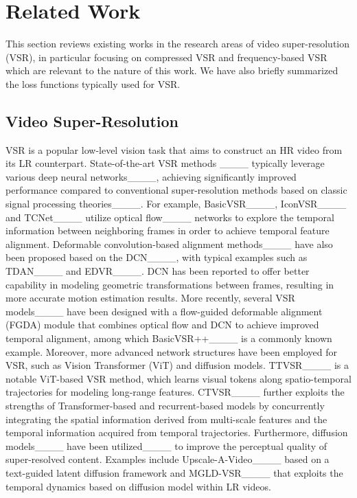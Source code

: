 \section{Related Work}
\label{RW}

This section reviews existing works in the research areas of video super-resolution (VSR), in particular focusing on compressed VSR and frequency-based VSR which are relevant to the nature of this work. We have also briefly summarized the loss functions typically used for VSR. 

\subsection{Video Super-Resolution}

VSR is a popular low-level vision task that aims to construct an HR video from its LR counterpart. State-of-the-art VSR methods ____ typically leverage various deep neural networks____, achieving significantly improved performance compared to conventional super-resolution methods based on classic signal processing theories____. For example, 
BasicVSR____, IconVSR____ and TCNet____ utilize optical flow____ networks to explore the temporal information between neighboring frames in order to achieve temporal feature alignment. Deformable convolution-based alignment methods____ have also been proposed based on the DCN____, with typical examples such as TDAN____ and EDVR____. DCN has been reported to offer better capability in modeling geometric transformations between frames, resulting in more accurate motion estimation results. More recently, several VSR models____ have been designed with a flow-guided deformable alignment (FGDA) module that combines optical flow and DCN to achieve improved temporal alignment, among which BasicVSR++____ is a commonly known example. Moreover, more advanced network structures have been employed for VSR, such as Vision Transformer (ViT) and diffusion models. TTVSR____ is a notable ViT-based VSR method, which learns visual tokens along spatio-temporal trajectories for modeling long-range features. CTVSR____ further exploits the strengths of Transformer-based and recurrent-based models by concurrently integrating the spatial information derived from multi-scale features and the temporal information acquired from temporal trajectories. Furthermore, diffusion models____ have been utilized____ to improve the perceptual quality of super-resolved content. Examples include Upscale-A-Video____ based on a text-guided latent diffusion framework and MGLD-VSR____ that exploits the temporal dynamics based on diffusion model within LR videos. 






